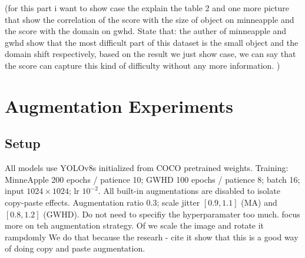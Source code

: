 \documentclass[conference]{IEEEtran}
\begin{document}
(for this part i want to show case the explain the table 2 and one more picture
that show the correlation of the score with the size of object on minneapple
and the score with the domain on gwhd.
State that: the auther of minneapple and gwhd show that the most difficult part 
of this dataset is the small object and the domain shift respectively,
based on the result we just show case, 
we can say that the score can capture this kind of difficulty without any more information.
)

\begin{table}[t]
\centering
\caption{GWHD domain difficulty: mean score vs.\ baseline AP.
  All 7 domains rank identically (Spearman $\rho{=}{-}1.00$,
  $p{<}0.001$, n=7 domains).}
\label{tab:domain}
\end{table}

\section{Augmentation Experiments}

\subsection{Setup}

All models use YOLOv8s initialized from COCO pretrained weights.
Training: MinneApple 200 epochs / patience 10; GWHD 100 epochs /
patience 8; batch 16; input $1024{\times}1024$; lr $10^{-2}$.
All built-in augmentations are disabled to isolate copy-paste effects.
Augmentation ratio 0.3; scale jitter $[0.9,1.1]$ (MA) and
$[0.8,1.2]$ (GWHD).
Do not need to specifiy the hyperparamater too much.
focus more on teh augmentation strategy.
Of we scale the image and rotate it rampdomly
We do that because the researh - cite it show that this is 
a good way of doing copy and paste augmentation.
\end{document}
